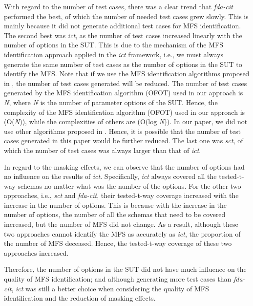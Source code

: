 \documentclass[journal,12pt,onecolumn,draftclsnofoot,]{IEEEtran}
\begin{document}
With regard to the number of test cases, there was a clear trend that \emph{fda-cit} performed the best, of which the number of needed test cases grew slowly. This is mainly because it did not generate additional test cases for MFS identification. The second best was \emph{ict}, as the number of test cases increased linearly with the number of options in the SUT. This is due to the mechanism of the MFS identification approach applied in the \emph{ict} framework, i.e., we must always generate the same number of test cases as the number of options in the SUT to identify the MFS. {\color{red} Note that if we use the MFS identification algorithms proposed in \cite{zhang2011characterizing,li2012improved,niu2013identifying}, the number of test cases generated will be reduced. The number of test cases generated by the MFS identification algorithm (OFOT) used in our approach is \emph{N}, where \emph{N} is the number of parameter options of the SUT. Hence, the complexity of the MFS identification algorithm (OFOT) used in our approach is (O(\emph{N})), while the complexities of others are (O(log \emph{N})). In our paper, we did not use other algorithms proposed in \cite{zhang2011characterizing,li2012improved,niu2013identifying}. Hence, it is possible that the number of test cases generated in this paper would be further reduced.} The last one was \emph{sct}, of which the number of test cases was always larger than that of \emph{ict}.


In regard to the masking effects, we can observe that the number of options had no influence on the results of \emph{ict}. Specifically, \emph{ict} always covered all the tested-t-way schemas no matter what was the number of the options. For the other two approaches, i.e., \emph{sct} and \emph{fda-cit}, their tested-t-way coverage increased with the increase in the number of options. This is because with the increase in the number of options, the number of all the schemas that need to be covered increased, but the number of MFS did not change. As a result, although these two approaches cannot identify the MFS as accurately as \emph{ict}, the proportion of the number of MFS deceased. Hence, the tested-t-way coverage of these two approaches increased.



Therefore, the number of options in the SUT did not have much influence on the quality of MFS identification; and although generating more test cases than \emph{fda-cit}, \emph{ict} was still a better choice when considering the quality of MFS identification and the reduction of masking effects.
\end{document}
